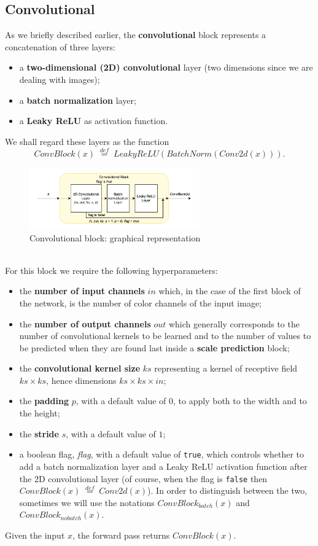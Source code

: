 \documentclass[../report.tex]{subfiles}
\begin{document}
\subsection{Convolutional}\label{ss:network-blocks-convolutional}
As we briefly described earlier, the \textbf{convolutional} block represents a concatenation of three layers:
\begin{itemize}
    \item a \textbf{two-dimensional (2D) convolutional} layer (two dimensions since we are dealing with images);
    \item a \textbf{batch normalization} layer;
    \item a \textbf{Leaky ReLU} as activation function.
\end{itemize}
We shall regard these layers as the function $$ConvBlock(x) \; \stackrel{def}{=} \; LeakyReLU(BatchNorm(Conv2d(x))).$$
\begin{figure}[h]
    \centering
    \includegraphics[width=0.65\textwidth]{assets/images/convolutional_block}
    \caption{Convolutional block: graphical representation}\label{img:convolutional_block}
\end{figure}\\
For this block we require the following hyperparameters:
\begin{itemize}
    \item the \textbf{number of input channels} $in$ which, in the case of the first block of the network, is the number of color channels of the input image;
    \item the \textbf{number of output channels} $out$ which generally corresponds to the number of convolutional kernels to be learned and to the number of values to be predicted when they are found last inside a \textbf{scale prediction} block;
    \item the \textbf{convolutional kernel size} $ks$ representing a kernel of receptive field $ks\times{}ks$, hence dimensions $ks\times{}ks\times{}in$;
    \item the \textbf{padding} $p$, with a default value of $0$, to apply both to the width and to the height;
    \item the \textbf{stride} $s$, with a default value of $1$;
    \item a boolean flag, \textit{flag}, with a default value of \texttt{true}, which controls whether to add a batch normalization layer and a Leaky ReLU activation function after the 2D convolutional layer (of course, when the flag is \texttt{false} then $ConvBlock(x) \; \stackrel{def}{=} \; Conv2d(x)$).\newline    
	In order to distinguish between the two, sometimes we will use the notations $ConvBlock_{batch}(x)$ and $ConvBlock_{nobatch}(x)$.
\end{itemize}
Given the input $x$, the forward pass returns $ConvBlock(x)$.
\end{document}

